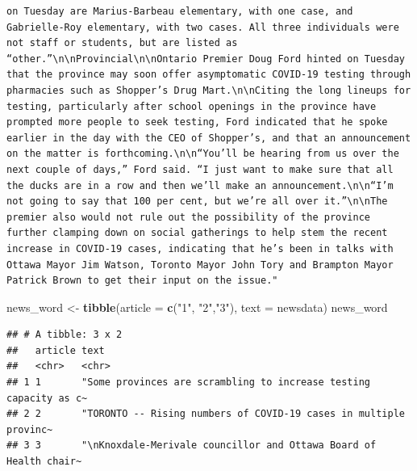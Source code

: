 \documentclass[]{article}
\newenvironment{Shaded}{\begin{snugshade}}{\end{snugshade}}
\newcommand{\DataTypeTok}[1]{\textcolor[rgb]{0.13,0.29,0.53}{#1}}
\newcommand{\KeywordTok}[1]{\textcolor[rgb]{0.13,0.29,0.53}{\textbf{#1}}}
\newcommand{\NormalTok}[1]{#1}
\newcommand{\OperatorTok}[1]{\textcolor[rgb]{0.81,0.36,0.00}{\textbf{#1}}}
\newcommand{\StringTok}[1]{\textcolor[rgb]{0.31,0.60,0.02}{#1}}
\begin{document}
\begin{verbatim}
on Tuesday are Marius-Barbeau elementary, with one case, and Gabrielle-Roy elementary, with two cases. All three individuals were not staff or students, but are listed as “other.”\n\nProvincial\n\nOntario Premier Doug Ford hinted on Tuesday that the province may soon offer asymptomatic COVID-19 testing through pharmacies such as Shopper’s Drug Mart.\n\nCiting the long lineups for testing, particularly after school openings in the province have prompted more people to seek testing, Ford indicated that he spoke earlier in the day with the CEO of Shopper’s, and that an announcement on the matter is forthcoming.\n\n“You’ll be hearing from us over the next couple of days,” Ford said. “I just want to make sure that all the ducks are in a row and then we’ll make an announcement.\n\n“I’m not going to say that 100 per cent, but we’re all over it.”\n\nThe premier also would not rule out the possibility of the province further clamping down on social gatherings to help stem the recent increase in COVID-19 cases, indicating that he’s been in talks with Ottawa Mayor Jim Watson, Toronto Mayor John Tory and Brampton Mayor Patrick Brown to get their input on the issue."
\end{verbatim}

\begin{Shaded}
\begin{Highlighting}[]
\NormalTok{news_word <-}\StringTok{ }\KeywordTok{tibble}\NormalTok{(}\DataTypeTok{article =} \KeywordTok{c}\NormalTok{(}\StringTok{"1"}\NormalTok{, }\StringTok{"2"}\NormalTok{,}\StringTok{"3"}\NormalTok{), }\DataTypeTok{text =}\NormalTok{ newsdata)}
\NormalTok{news_word}
\end{Highlighting}
\end{Shaded}

\begin{verbatim}
## # A tibble: 3 x 2
##   article text                                                             
##   <chr>   <chr>                                                            
## 1 1       "Some provinces are scrambling to increase testing capacity as c~
## 2 2       "TORONTO -- Rising numbers of COVID-19 cases in multiple provinc~
## 3 3       "\nKnoxdale-Merivale councillor and Ottawa Board of Health chair~
\end{verbatim}

\begin{Shaded}
\end{Shaded}
\end{document}
